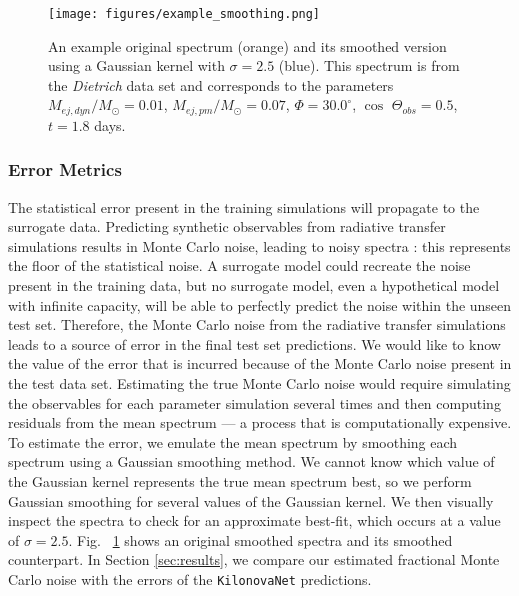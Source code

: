 \documentclass[fleqn,usenatbib,useAMS]{mnras}
\begin{document}
\begin{figure}
    \centering
    \texttt{[image: figures/example\_smoothing.png]}
    \caption{An example original spectrum (orange) and its smoothed version using a Gaussian kernel with $\sigma=2.5$ (blue). This spectrum is from the \emph{Dietrich} data set and corresponds to the parameters $M_{ej, dyn}/M_{\odot} = 0.01$, $M_{ej, pm}/M_{\odot} = 0.07$, $\Phi = 30.0^{\circ}$, $\cos$ $\Theta_{obs} = 0.5$, $t = 1.8$ days.}
    \label{fig:fft_original_example}
\end{figure}


\subsubsection{Error Metrics}
\label{sec:err_metrics}

The statistical error present in the training simulations will propagate to the surrogate data.
Predicting synthetic observables from radiative transfer simulations results in Monte Carlo noise, leading to noisy spectra \citep{bullaPOSSISPredictingSpectra2019, kasenOriginHeavyElements2017}: this represents the floor of the statistical noise.
A surrogate model could recreate the noise present in the training data, but no surrogate model, even a hypothetical model with infinite capacity, will be able to perfectly predict the noise within the unseen test set.
Therefore, the Monte Carlo noise from the radiative transfer simulations leads to a source of error in the final test set predictions.
We would like to know the value of the error that is incurred because of the Monte Carlo noise present in the test data set.
Estimating the true Monte Carlo noise would require simulating the observables for each parameter simulation several times and then computing residuals from the mean spectrum \citep{bullaPolarizationSpectralSynthesis2015}--- a process that is computationally expensive.
To estimate the error, we emulate the mean spectrum by smoothing each spectrum using a Gaussian smoothing method.
We cannot know which value of the Gaussian kernel represents the true mean spectrum best, so we perform Gaussian smoothing for several values of the Gaussian kernel.
We then visually inspect the spectra to check for an approximate best-fit, which occurs at a value of $\sigma=2.5$. 
Fig.~ \ref{fig:fft_original_example} shows an original smoothed spectra and its smoothed counterpart.
In Section \ref{sec:results}, we compare our estimated fractional Monte Carlo noise with the errors of the \texttt{KilonovaNet} predictions.
\end{document}
